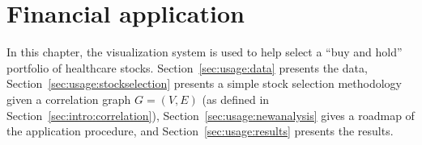 
\chapter{Financial application \label{ch:usage}}

In this chapter, the visualization system is used to help select a ``buy and 
hold'' portfolio of healthcare stocks. 
Section~\ref{sec:usage:data} presents the data, 
Section~\ref{sec:usage:stockselection} presents a simple stock selection 
methodology given a correlation graph $G=(V,E)$ (as defined in 
Section~\ref{sec:intro:correlation}), 
Section~\ref{sec:usage:newanalysis} gives a roadmap of the application 
procedure, and Section~\ref{sec:usage:results} presents the results.



%



